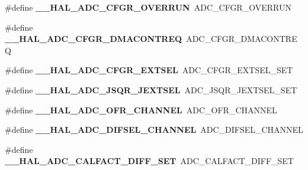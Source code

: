 \begin{DoxyCompactItemize}
\item 
\mbox{\label{group___h_a_l___a_d_c___aliased___macros_ga4312a4ed4373cdd0302434574aa0c8c9}} 
\#define {\bfseries \+\_\+\+\_\+\+H\+A\+L\+\_\+\+A\+D\+C\+\_\+\+C\+F\+G\+R\+\_\+\+O\+V\+E\+R\+R\+UN}~A\+D\+C\+\_\+\+C\+F\+G\+R\+\_\+\+O\+V\+E\+R\+R\+UN
\item 
\mbox{\label{group___h_a_l___a_d_c___aliased___macros_gaa80ebf8b334aa3e040d153ec06c880e2}} 
\#define {\bfseries \+\_\+\+\_\+\+H\+A\+L\+\_\+\+A\+D\+C\+\_\+\+C\+F\+G\+R\+\_\+\+D\+M\+A\+C\+O\+N\+T\+R\+EQ}~A\+D\+C\+\_\+\+C\+F\+G\+R\+\_\+\+D\+M\+A\+C\+O\+N\+T\+R\+EQ
\item 
\mbox{\label{group___h_a_l___a_d_c___aliased___macros_gacc58e207b5fcc238afb480a00997d167}} 
\#define {\bfseries \+\_\+\+\_\+\+H\+A\+L\+\_\+\+A\+D\+C\+\_\+\+C\+F\+G\+R\+\_\+\+E\+X\+T\+S\+EL}~A\+D\+C\+\_\+\+C\+F\+G\+R\+\_\+\+E\+X\+T\+S\+E\+L\+\_\+\+S\+ET
\item 
\mbox{\label{group___h_a_l___a_d_c___aliased___macros_ga362667abab4da4e626e45c9aef345d85}} 
\#define {\bfseries \+\_\+\+\_\+\+H\+A\+L\+\_\+\+A\+D\+C\+\_\+\+J\+S\+Q\+R\+\_\+\+J\+E\+X\+T\+S\+EL}~A\+D\+C\+\_\+\+J\+S\+Q\+R\+\_\+\+J\+E\+X\+T\+S\+E\+L\+\_\+\+S\+ET
\item 
\mbox{\label{group___h_a_l___a_d_c___aliased___macros_gad3ba77f5090921040fa9a63ff8d31241}} 
\#define {\bfseries \+\_\+\+\_\+\+H\+A\+L\+\_\+\+A\+D\+C\+\_\+\+O\+F\+R\+\_\+\+C\+H\+A\+N\+N\+EL}~A\+D\+C\+\_\+\+O\+F\+R\+\_\+\+C\+H\+A\+N\+N\+EL
\item 
\mbox{\label{group___h_a_l___a_d_c___aliased___macros_ga697c5bcf01d90462bf0c65c1434204a2}} 
\#define {\bfseries \+\_\+\+\_\+\+H\+A\+L\+\_\+\+A\+D\+C\+\_\+\+D\+I\+F\+S\+E\+L\+\_\+\+C\+H\+A\+N\+N\+EL}~A\+D\+C\+\_\+\+D\+I\+F\+S\+E\+L\+\_\+\+C\+H\+A\+N\+N\+EL
\item 
\mbox{\label{group___h_a_l___a_d_c___aliased___macros_ga0d6a948351847da8e821fd673cd5395c}} 
\#define {\bfseries \+\_\+\+\_\+\+H\+A\+L\+\_\+\+A\+D\+C\+\_\+\+C\+A\+L\+F\+A\+C\+T\+\_\+\+D\+I\+F\+F\+\_\+\+S\+ET}~A\+D\+C\+\_\+\+C\+A\+L\+F\+A\+C\+T\+\_\+\+D\+I\+F\+F\+\_\+\+S\+ET

\end{DoxyCompactItemize}

